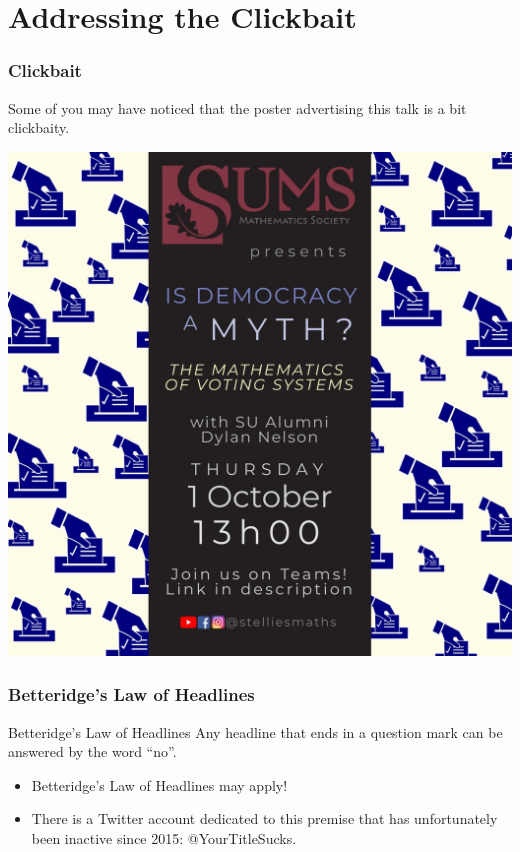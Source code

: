 \documentclass{beamer}
\begin{document}
    \section{Addressing the Clickbait}
    \begin{frame}
        \frametitle{Clickbait}
    
        Some of you may have noticed that the poster advertising this talk is a bit clickbaity.

        \begin{center}
            \includegraphics[width=0.5\linewidth]{poster.jpeg}
        \end{center}
    
    \end{frame}
    \begin{frame}
        \frametitle{Betteridge's Law of Headlines}
    
        \begin{block}{Betteridge's Law of Headlines}
            Any headline that ends in a question mark can be answered by the word ``no''.
        \end{block} 

        \begin{itemize}
            \item Betteridge's Law of Headlines may apply! \pause
            \item There is a Twitter account dedicated to this premise that has unfortunately been inactive since 2015: @YourTitleSucks.
        \end{itemize}

    \end{frame}
\end{document}

